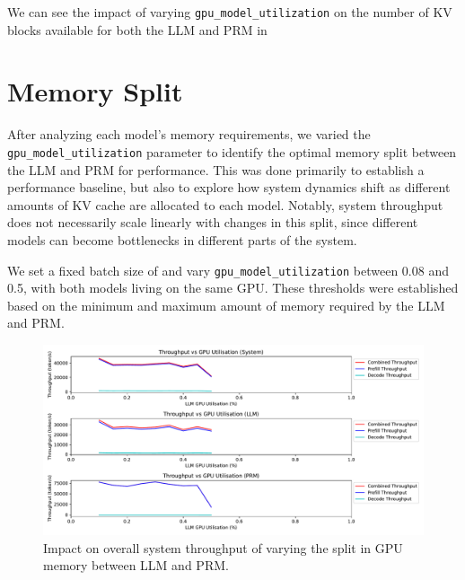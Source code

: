 \documentclass[11pt,twoside]{report}
\begin{document}
We can see the impact of varying \texttt{gpu\_model\_utilization} on the number of KV blocks available for both the LLM and PRM in %

\section{Memory Split}

After analyzing each model's memory requirements, we varied the \texttt{gpu\_model\_utilization} parameter to identify the optimal memory split between the LLM and PRM for performance. 
This was done primarily to establish a performance baseline, but also to explore how system dynamics shift as different amounts of KV cache are allocated to each model. 
Notably, system throughput does not necessarily scale linearly with changes in this split, since different models can become bottlenecks in different parts of the system.

We set a fixed batch size of and vary \texttt{gpu\_model\_utilization} between 0.08 and 0.5, with both models living on the same GPU.
These thresholds were established based on the minimum and maximum amount of memory required by the LLM and PRM.

\begin{figure}[htbp]
  \centering
  \includegraphics[width=\textwidth]{figures/system_throughput_gpu_utilisation.pdf}
  \caption{Impact on overall system throughput of varying the split in GPU memory between LLM and PRM.}
  \label{fig:system_throughput_gpu_utilisation}
\end{figure}
\end{document}
